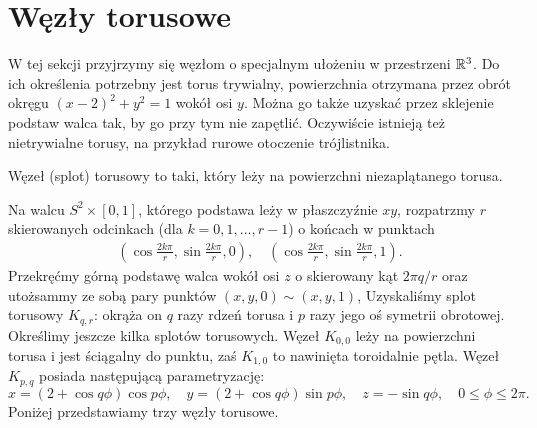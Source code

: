 \section{Węzły torusowe} %
\label{sec:torus}
W tej sekcji przyjrzymy się węzłom o specjalnym ułożeniu w przestrzeni $\mathbb R^3$.
Do ich określenia potrzebny jest torus trywialny,
powierzchnia otrzymana przez obrót okręgu $(x-2)^2 + y^2 = 1$ wokół osi $y$.
Można go także uzyskać przez sklejenie podstaw walca tak, by go przy tym nie zapętlić.
Oczywiście istnieją też nietrywialne torusy, na przykład rurowe otoczenie trójlistnika.

\begin{definition}
    Węzeł (splot) torusowy to taki, który leży na powierzchni niezaplątanego torusa.
\end{definition}

Na walcu $S^2 \times [0,1]$, którego podstawa leży w płaszczyźnie $xy$, rozpatrzmy $r$ skierowanych odcinkach (dla $k = 0, 1, \ldots, r - 1$) o końcach w punktach
\begin{align*}
    \left(\cos \frac{2k \pi}{r}, \sin \frac{2k\pi}{r}, 0 \right), \quad
    \left(\cos \frac{2k \pi}{r}, \sin \frac{2k\pi}{r}, 1 \right).
\end{align*}
Przekręćmy górną podstawę walca wokół osi $z$ o skierowany kąt $2\pi q / r$ oraz utożsammy ze sobą pary punktów $(x, y, 0) \sim (x, y, 1)$,
Uzyskaliśmy splot torusowy $K_{q, r}$: okrąża on $q$ razy rdzeń torusa i $p$ razy jego oś symetrii obrotowej.
Określimy jeszcze kilka splotów torusowych.
Węzeł $K_{0, 0}$ leży na powierzchni torusa i jest ściągalny do punktu, zaś $K_{1, 0}$ to nawinięta toroidalnie pętla.
Węzeł $K_{p, q}$ posiada następującą parametryzację:
\[
    x = (2+\cos q \phi) \cos p \phi, \quad
    y = (2+\cos q \phi) \sin p \phi, \quad
    z = - \sin q \phi, \quad
    0 \le \phi \le 2\pi.
\]
Poniżej przedstawiamy trzy węzły torusowe.

